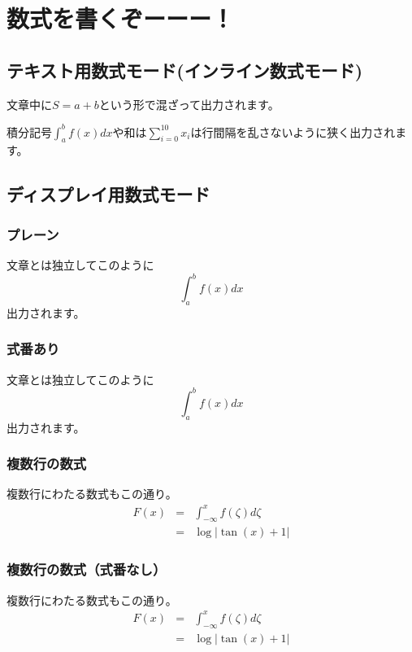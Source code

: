 \documentclass[a4paper, uplatex]{jlreq}
\newcommand{\明石}{明石工業高等専門がおっこう電機情報工学科}
\begin{document}
	\newpage
	
	\section{数式を書くぞーーー！}
	\subsection{テキスト用数式モード(インライン数式モード)}
	文章中に$S=a+b$という形で混ざって出力されます。
	
	積分記号$\int_a^bf(x)dx$や和は$\sum_{i=0}^{10} x_i$は行間隔を乱さないように狭く出力されます。
	
	\subsection{ディスプレイ用数式モード}
	\subsubsection{プレーン}
	文章とは独立してこのように
	\[
	\int_a^b f (x) dx
	\]
	出力されます。
	
	\subsubsection{式番あり}
	文章とは独立してこのように
	\begin{equation}
		\int_a^b f (x) dx
	\end{equation}
	出力されます。
	
	\subsubsection{複数行の数式}
	複数行にわたる数式もこの通り。
	\begin{eqnarray}
		F(x) &=& \int_{-\infty}^x f(\zeta)d\zeta\\
		&=& \log |\tan(x)+1|
	\end{eqnarray}
	
	\subsubsection{複数行の数式（式番なし）}
	複数行にわたる数式もこの通り。
	\begin{eqnarray*}
		F(x) &=& \int_{-\infty}^x f(\zeta)d\zeta\\
		&=& \log |\tan(x)+1|
	\end{eqnarray*}
	
	\newpage
	
\end{document}
